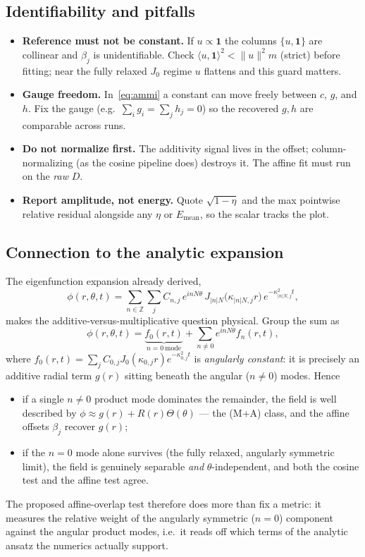 \documentclass{article}
\begin{document}
\subsection{Identifiability and pitfalls}
\begin{itemize}
\item \textbf{Reference must not be constant.} If $u\propto\mathbf 1$ the columns
$\{u,\mathbf 1\}$ are collinear and $\beta_{j}$ is unidentifiable. Check
$\langle u,\mathbf 1\rangle^{2}<\|u\|^{2}m$ (strict) before fitting; near the
fully relaxed $J_{0}$ regime $u$ flattens and this guard matters.
\item \textbf{Gauge freedom.} In~\eqref{eq:ammi} a constant can move freely
between $c$, $g$, and $h$. Fix the gauge (e.g.\ $\sum_i g_i=\sum_j h_j=0$) so
the recovered $g,h$ are comparable across runs.
\item \textbf{Do not normalize first.} The additivity signal lives in the
offset; column-normalizing (as the cosine pipeline does) destroys it. The
affine fit must run on the \emph{raw} $D$.
\item \textbf{Report amplitude, not energy.} Quote $\sqrt{1-\eta}$ and the
max pointwise relative residual alongside any $\eta$ or $E_{\mathrm{mean}}$,
so the scalar tracks the plot.
\end{itemize}

\subsection{Connection to the analytic expansion}

The eigenfunction expansion already derived,
\begin{equation}
\phi(r,\theta,t)=\sum_{n\in\mathbb{Z}}\sum_{j}
C_{n,j}\,e^{inN\theta}\,J_{|n|N}\!\bigl(\kappa_{|n|N,j}r\bigr)
\,e^{-\kappa^{2}_{|n|N,j}t},
\end{equation}
makes the additive-versus-multiplicative question physical. Group the sum as
\begin{equation}
\phi(r,\theta,t)=\underbrace{f_{0}(r,t)}_{n=0\ \text{mode}}
+\sum_{n\neq0}e^{inN\theta}f_{n}(r,t),
\end{equation}
where $f_{0}(r,t)=\sum_{j}C_{0,j}J_{0}(\kappa_{0,j}r)e^{-\kappa_{0,j}^{2}t}$ is
\emph{angularly constant}: it is precisely an additive radial term $g(r)$
sitting beneath the angular ($n\neq0$) modes. Hence
\begin{itemize}
\item if a single $n\neq0$ product mode dominates the remainder, the field is
well described by $\phi\approx g(r)+R(r)\Theta(\theta)$ --- the (M+A) class,
and the affine offsets $\beta_{j}$ recover $g(r)$;
\item if the $n=0$ mode alone survives (the fully relaxed, angularly symmetric
limit), the field is genuinely separable \emph{and} $\theta$-independent, and
both the cosine test and the affine test agree.
\end{itemize}
The proposed affine-overlap test therefore does more than fix a metric: it
measures the relative weight of the angularly symmetric ($n=0$) component
against the angular product modes, i.e.\ it reads off which terms of the
analytic ansatz the numerics actually support.
\end{document}
